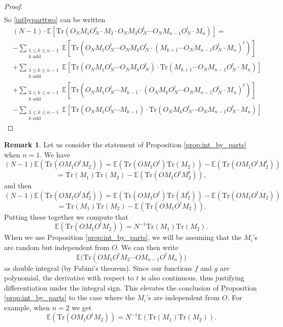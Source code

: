 \documentclass[11pt]{amsart}
\theoremstyle{definition}
\newtheorem{remark}[theorem]{Remark}
\numberwithin{theorem}{section}
\newcommand{\rE} {\mathbb{E}}
\newcommand{\Tr}{\mathrm{Tr}}
\begin{document}
\begin{proof}
\begin{align*}
\end{align*}
So \eqref{intbyparttwo} can be written
\begin{align*}
&(N-1)\cdot \mathbb{E}\left[\Tr(O_NM_1O_N^t\cdot  M_2 \cdot O_NM_3O_N^t\cdots O_NM_{n-1}O_N^t\cdot M_n)\right]=\\
&-\sum_{\substack{1\leq k \leq n-1\\k\text{ odd}}}\mathbb{E}\left[\Tr(O_N M_1O_N^t\cdots O_NM_{k}O_N^t\cdot (M_{k+1}\cdots  O_NM_{n-1}O_N^t\cdot M_n)^t)\right]\\
&+\sum_{\substack{1\leq k \leq n-1\\k\text{ odd}}}\mathbb{E}\left[\Tr(O_N M_1O_N^t\cdots O_NM_{k}O_N^t)\cdot \Tr(M_{k+1}\cdots  O_NM_{n-1}O_N^t\cdot M_n)\right]\\
&+\sum_{\substack{3\leq k \leq n-1\\k\text{ odd}}}\mathbb{E}\left[\Tr(O_N M_1O_N^t\cdots M_{k-1}\cdot (O_NM_{k}O_N^t\cdots O_NM_{n-1}O_N^t\cdot  M_n)^t)\right]\\
&-\sum_{\substack{3\leq k \leq n-1\\k\text{ odd}}}\mathbb{E}\left[\Tr(O_N M_1O_N^t\cdots M_{k-1})\cdot \Tr(O_NM_{k}O_N^t\cdots O_NM_{n-1}O_N^t\cdot  M_n)\right]
\end{align*}
\end{proof}


\begin{remark}
Let us consider the statement of Proposition
\ref{prop:int_by_parts} when $n = 1$. We have
\[
(N - 1) \rE(\Tr(OM_1 O^t M_2))
=
\rE(\Tr(O M_1 O^t)\Tr(M_2)) - \rE(\Tr(O M_1 O^t M_2^t))
\]
\[
=
\Tr(M_1) \Tr(M_2) - \rE(\Tr(O M_1 O^t M_2^t)), 
\]
and then 
\[
(N - 1) \rE(\Tr(OM_1 O^t M_2^t))
=
\rE(\Tr(O M_1 O^t)\Tr(M_2^t)) - \rE(\Tr(O M_1 O^t M_2))
\]
\[
=
\Tr(M_1) \Tr(M_2) - \rE(\Tr(O M_1 O^t M_2)). 
\]
Putting these together we compute that
\[
\rE(\Tr( O M_1 O^t M_2)) = N^{-1}\Tr( M_1) \Tr(M_2).
\]
When we use Proposition \ref{prop:int_by_parts}, we will be
assuming that the $M_i$'s are random but independent from
$O$. We can then write
\[
\mathbb{E}\big(\Tr(O M_1 O^t  M_2 \cdots O M_{n-1}O^t M_n)\big)
\]
as double integral (by Fubini's theorem). Since our
functions $f$ and $g$ are polynomial, the derivative with
respect to $t$ is also continuous, thus justifying
differentiation under the integral sign. This elevates the
conclusion of Proposition \ref{prop:int_by_parts} to the
case where the $M_i$'s are independent from $O$. For
example, when $n=2$ we get
\[
\rE(\Tr( O M_1 O^t M_2)) = N^{-1}\rE( \Tr( M_1) \Tr(M_2) ).
\]
\end{remark}
\end{document}

